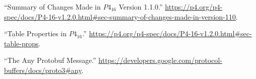 \documentclass[11pt]{article}
\begin{document}
{{\begin{thebibliography}{39}
\mdbibitemlabel{{}[29]}\textquotedblleft{}Summary of Changes Made in $P4_{16}$ Version 1.1.0.\textquotedblright{} \href{https://p4.org/p4-spec/docs/P4-16-v1.2.0.html\%23sec-summary-of-changes-made-in-version-110}{{\ttfamily https://\hspace{0pt}p4.\hspace{0pt}org/\hspace{0pt}p4-\hspace{0pt}spec/\hspace{0pt}docs/\hspace{0pt}P4-\hspace{0pt}16-\hspace{0pt}v1.\hspace{0pt}2.\hspace{0pt}0.\hspace{0pt}html\#\hspace{0pt}sec-\hspace{0pt}summary-\hspace{0pt}of-\hspace{0pt}changes-\hspace{0pt}made-\hspace{0pt}in-\hspace{0pt}version-\hspace{0pt}110}}.\label{p4revisions110}%

\mdbibitemlabel{{}[30]}\textquotedblleft{}Table Properties in $P4_{16}$.\textquotedblright{} \href{https://p4.org/p4-spec/docs/P4-16-v1.2.0.html\%23sec-table-props}{{\ttfamily https://\hspace{0pt}p4.\hspace{0pt}org/\hspace{0pt}p4-\hspace{0pt}spec/\hspace{0pt}docs/\hspace{0pt}P4-\hspace{0pt}16-\hspace{0pt}v1.\hspace{0pt}2.\hspace{0pt}0.\hspace{0pt}html\#\hspace{0pt}sec-\hspace{0pt}table-\hspace{0pt}props}}.\label{p4tableproperties}%

\mdbibitemlabel{{}[31]}\textquotedblleft{}The Any Protobuf Message.\textquotedblright{} \href{https://developers.google.com/protocol-buffers/docs/proto3\%23any}{{\ttfamily https://\hspace{0pt}developers.\hspace{0pt}google.\hspace{0pt}com/\hspace{0pt}protocol-\hspace{0pt}buffers/\hspace{0pt}docs/\hspace{0pt}proto3\#\hspace{0pt}any}}.\label{protoany}%


\end{thebibliography}}}
\end{document}
